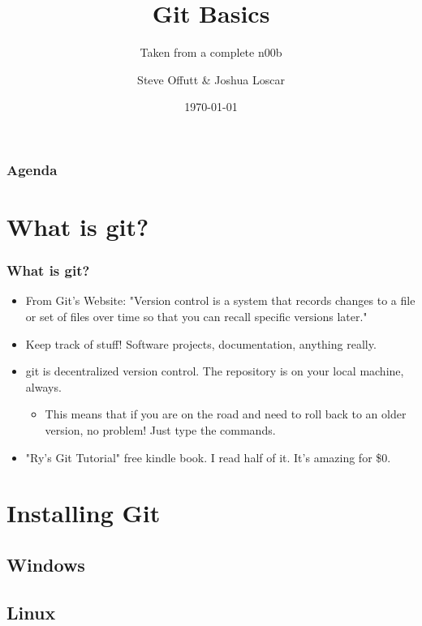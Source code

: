 \documentclass{beamer}
\title{Git Basics}
\subtitle{Taken from a complete n00b}
\author{Steve Offutt \& Joshua Loscar}
\institute{OSSEM}
\date{\today}
\begin{document}
\begin{frame}
    \titlepage
\end{frame}

\begin{frame}
    \frametitle{Agenda}
    \tableofcontents
\end{frame} 

\section{What is git?}
\begin{frame}
    \frametitle{What is git?}
    \begin{itemize}
        \item{From Git's Website:}
            "Version control is a system that records changes to a file or set of files over time so that you can recall specific versions later."
        \item{Keep track of stuff! Software projects, documentation, anything really.}
        \item{git is decentralized version control. The repository is on your local machine, always.}
            \begin{itemize}
                \item{This means that if you are on the road and need to roll back to an older version, no problem! Just type the commands.}
            \end{itemize}
        \item{"Ry's Git Tutorial" free kindle book. I read half of it. It's amazing for \$0.}
    \end{itemize}
\end{frame} 

\section{Installing Git}
\subsection{Windows}
\subsection{Linux}
\end{document}
